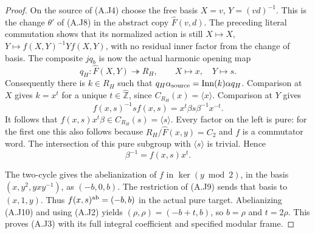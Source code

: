 \begin{proof}
On the source of (A.J4) choose the free basis
$X=v$, $Y=(vd)^{-1}$.  This is the change $\theta'$ of (A.J8)
in the abstract copy $\widehat F(v,d)$.  The preceding literal
commutation shows that its normalized action is still
$X\mapsto X$, $Y\mapsto f(X,Y)^{-1}Yf(X,Y)$, with no
residual inner factor from the change of basis.  The composite
$j q_b$ is now the actual harmonic opening map
\[
 q_H:\widehat F(X,Y)\twoheadrightarrow R_H,
 \qquad X\mapsto x,\quad Y\mapsto s.
 \tag{A.J9}
\]
Consequently there is $k\in R_H$ such that
$q_H\alpha_{\rm source}=\operatorname{Inn}(k)\alpha q_H$.
Comparison at $X$ gives $k=x^t$ for a unique
$t\in\widehat{\mathbb Z}$, since $C_{R_H}(x)=\langle x\rangle$.
Comparison at $Y$ gives
\[
 f(x,s)^{-1}sf(x,s)=x^t\beta s\beta^{-1}x^{-t}.
\]
It follows that $f(x,s)x^t\beta\in C_{R_H}(s)=\langle s\rangle$.
Every factor on the left is pure: for the first one this also
follows because $R_H/\widehat F(x,y)=C_2$ and $f$ is a
commutator word.  The intersection of this pure subgroup with
$\langle s\rangle$ is trivial.  Hence
\[
                   \beta^{-1}=f(x,s)x^t.                 \tag{A.J10}
\]

The two-cycle gives the abelianization of $f$ in
$\ker(y\bmod2)$, in the basis $(x,y^2,yxy^{-1})$, as
$(-b,0,b)$.  The restriction of (A.J9) sends that basis to
$(x,1,y)$.  Thus $f(x,s)^{\rm ab}=(-b,b)$ in the actual pure
target.  Abelianizing (A.J10) and using (A.J2) yields
$(\rho,\rho)=(-b+t,b)$, so $b=\rho$ and $t=2\rho$.
This proves (A.J3) with its full integral coefficient and
specified modular frame.
\end{proof}


